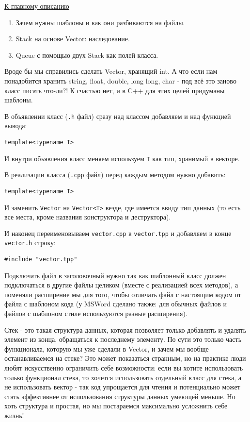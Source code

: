 \label{md2tex4}
\hyperref[md2texREADME]{К главному описанию}


\begin{enumerate}
    \item Зачем нужны шаблоны и как они разбиваются на файлы.
    \item Stack на основе Vector: наследование.
    \item Queue с помощью двух Stack как полей класса.
\end{enumerate}


Вроде бы мы справились сделать Vector, хранящий int. А что если нам понадобится хранить string, float, double, long long, char - под всё это заново класс писать что-ли?! К счастью нет, и в C++ для этих целей придуманы шаблоны.


В объявлении класс (\texttt{.h} файл) сразу над классом добавляем и над функцией вывода:
\begin{verbatim}
template<typename T>
\end{verbatim}
И внутри объявления класс меняем используем \texttt{T} как тип, хранимый в векторе.

В реализации класса (\texttt{.cpp} файл) перед каждым методом нужно добавить:
\begin{verbatim}
template<typename T>
\end{verbatim}
И заменить \texttt{Vector} на \texttt{Vector<T>} везде, где имеется ввиду тип данных (то есть все места, кроме названия конструктора и деструктора).

И наконец переименовываем \texttt{vector.cpp} в \texttt{vector.tpp} и добавляем в конце \texttt{vector.h} строку:
\begin{verbatim}
#include "vector.tpp"
\end{verbatim}
Подключать файл в заголовочный нужно так как шаблонный класс должен подключаться в другие файлы целиком (вместе с реализацией всех методов), а поменяли расширение мы для того, чтобы отличать файл с настоящим кодом от файла с шаблоном кода (у MSWord сделано также: для обычных файлов и файлов с шаблоном стиле используются разные расширения).


Стек - это такая структура данных, которая позволяет только добавлять и удалять элемент из конца, обращаться к последнему элементу. По сути это только часть функционала, которую мы уже сделали в Vector, и зачем мы вообще останавливаемся на стеке? Это может показаться странным, но на практике люди любят искусственно ограничить себе возможности: если вы хотите использовать только функционал стека, то хочется использовать отдельный класс для стека, а не использовать вектор - так код упрощается для чтения и потенциально может стать эффективнее от использования структуры данных умеющей меньше. Но хоть структура и простая, но мы постараемся максимально усложнить себе жизнь!

